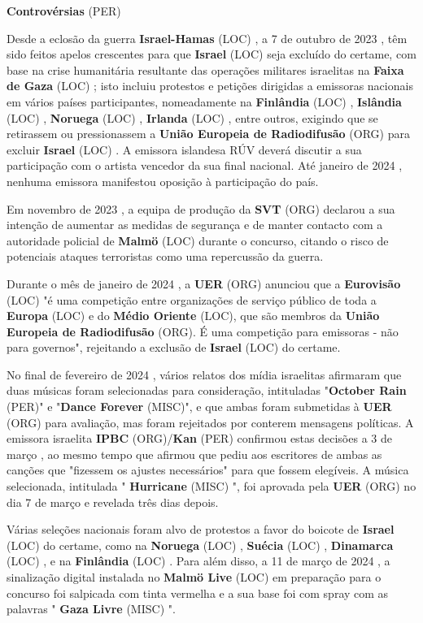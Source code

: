 \documentclass[12pt,a4paper]{article}
\begin{document}
\textbf{Controvérsias} (PER)

Desde a eclosão da guerra \textbf{Israel-Hamas} (LOC) , a 7 de outubro de 2023 , têm sido feitos apelos crescentes para que \textbf{Israel} (LOC) seja excluído do certame, com base na crise humanitária resultante das operações militares israelitas na \textbf{Faixa de Gaza} (LOC) ; isto incluiu protestos e petições dirigidas a emissoras nacionais em vários países participantes, nomeadamente na \textbf{Finlândia} (LOC) , \textbf{Islândia} (LOC) , \textbf{Noruega} (LOC) , \textbf{Irlanda} (LOC) , entre outros, exigindo que se retirassem ou pressionassem a \textbf{União Europeia de Radiodifusão} (ORG) para excluir \textbf{Israel} (LOC) . A emissora islandesa RÚV deverá discutir a sua participação com o artista vencedor da sua final nacional. Até janeiro de 2024 , nenhuma emissora manifestou oposição à participação do país.

Em novembro de 2023 , a equipa de produção da \textbf{SVT} (ORG) declarou a sua intenção de aumentar as medidas de segurança e de manter contacto com a autoridade policial de \textbf{Malmö} (LOC) durante o concurso, citando o risco de potenciais ataques terroristas como uma repercussão da guerra.

Durante o mês de janeiro de 2024 , a \textbf{UER} (ORG) anunciou que a \textbf{Eurovisão} (LOC) "é uma competição entre organizações de serviço público de toda a \textbf{Europa} (LOC) e do \textbf{Médio Oriente} (LOC), que são membros da \textbf{União Europeia de Radiodifusão} (ORG). É uma competição para emissoras - não para governos", rejeitando a exclusão de \textbf{Israel} (LOC) do certame.

No final de fevereiro de 2024 , vários relatos dos mídia israelitas afirmaram que duas músicas foram selecionadas para consideração, intituladas "\textbf{October Rain} (PER)" e "\textbf{Dance Forever} (MISC)", e que ambas foram submetidas à \textbf{UER} (ORG) para avaliação, mas foram rejeitados por conterem mensagens políticas. A emissora israelita \textbf{IPBC} (ORG)/\textbf{Kan} (PER) confirmou estas decisões a 3 de março , ao mesmo tempo que afirmou que pediu aos escritores de ambas as canções que "fizessem os ajustes necessários" para que fossem elegíveis. A música selecionada, intitulada " \textbf{Hurricane} (MISC) ", foi aprovada pela \textbf{UER} (ORG) no dia 7 de março e revelada três dias depois.

Várias seleções nacionais foram alvo de protestos a favor do boicote de \textbf{Israel} (LOC) do certame, como na \textbf{Noruega} (LOC) , \textbf{Suécia} (LOC) , \textbf{Dinamarca} (LOC) , e na \textbf{Finlândia} (LOC) . Para além disso, a 11 de março de 2024 , a sinalização digital instalada no \textbf{Malmö Live} (LOC) em preparação para o concurso foi salpicada com tinta vermelha e a sua base foi com spray com as palavras " \textbf{Gaza Livre} (MISC) ".
\end{document}
